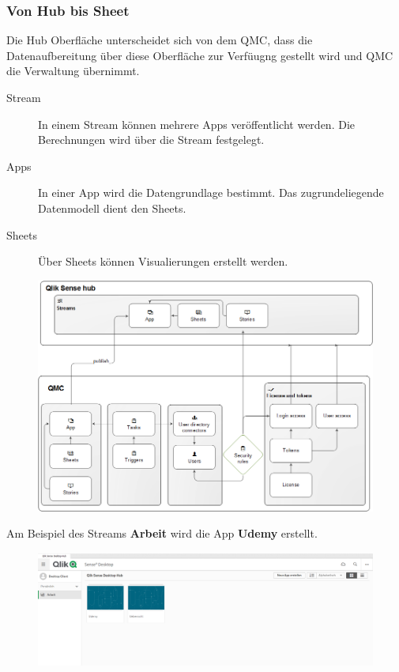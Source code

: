\subsubsection{Von Hub bis Sheet}
Die Hub Oberfläche unterscheidet sich von dem \gls{QMC}, dass die Datenaufbereitung über diese Oberfläche zur Verfüugng gestellt wird und \gls{QMC} die Verwaltung übernimmt.
\begin{description}
	\item[Stream] In einem Stream können mehrere Apps veröffentlicht werden. Die Berechnungen wird über die Stream festgelegt.
	\item[Apps] In einer App wird die Datengrundlage bestimmt. Das zugrundeliegende Datenmodell dient den Sheets.
	\item[Sheets] Über Sheets können Visualierungen erstellt werden.
\end{description}

\begin{figure}[H]
	\centering
	\includegraphics[scale = 0.3]{attachment/chapter_3/Scc015}
	\caption{}
	\label{fig:Scc015}
\end{figure}
Am Beispiel des Streams \textbf{Arbeit} wird die App \textbf{Udemy} erstellt.

\begin{figure}[H]
	\centering
	\includegraphics[scale = 0.3]{attachment/chapter_3/Scc011}
	\caption{}
	\label{fig:Scc011}
\end{figure}

